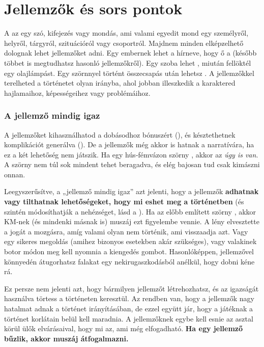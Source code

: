 \chapter{Jellemzők és sors pontok}

A  az egy szó, kifejezés vagy mondás, ami valami egyedit mond egy személyről, helyről, tárgyról, szituációról vagy csoportról. Majdnem minden elképzelhető dolognak lehet jellemzőket adni. Egy embernek lehet a hírneve, hogy ő a  (később többet is megtudhatsz hasonló jellemzőkről). Egy szoba lehet , miután fellöktél egy olajlámpást. Egy szörnnyel történt összecsapás után lehetsz . A jellemzőkkel terelheted a történetet olyan irányba, ahol jobban illeszkedik a karaktered hajlamaihoz, képességeihez vagy problémáihoz.

\subsection{A jellemző mindig igaz}

A jellemzőket kihasználhatod a dobásodhoz bónuszért (), és késztethetnek komplikációt generálva (). De a jellemzők még akkor is hatnak a narratívára, ha ez a két lehetőség nem játszik. Ha egy hús‑fémvázon szörny , akkor az \emph{úgy is van}. A szörny nem túl sok mindent tehet beragadva, és elég bajosan tud csak kimászni onnan.

Leegyszerűsítve, a „jellemző mindig igaz” azt jelenti, hogy a jellemzők \textbf{adhatnak vagy tilthatnak lehetőségeket, hogy mi eshet meg a történetben} (és szintén módosíthatják a nehézséget, lásd a ). Ha az előbb említett szörny , akkor KM‑nek (és mindenki másnak is) muszáj ezt figyelembe vennie. A lény elvesztette a jogát a mozgásra, amíg valami olyan nem történik, ami visszaadja azt. Vagy egy sikeres megoldás (amihez bizonyos esetekben akár  szükséges), vagy valakinek botor módon meg kell nyomnia a kiengedés gombot. Hasonlóképpen,  jellemzővel könnyedén átugorhatsz falakat egy nekirugaszkodásból anélkül, hogy dobni kéne rá.

Ez persze nem jelenti azt, hogy bármilyen jellemzőt létrehozhatsz, és az igazságát használva törtess a történeten keresztül. Az rendben van, hogy a jellemzők nagy hatalmat adnak a történet irányításában, de ezzel együtt jár, hogy a játéknak a történet korlátain belül kell maradnia. A jellemzőknek egybe kell esnie az asztal körül ülők elvárásaival, hogy mi az, ami még elfogadható. \textbf{Ha egy jellemző bűzlik, akkor muszáj átfogalmazni.}

